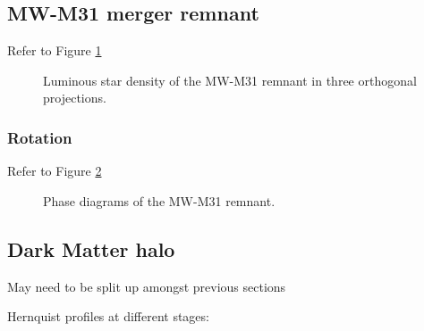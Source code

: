 \documentclass[twocolumn]{aastex63}
\newcommand{\todo}{\color{red}{TODO}\color{black}\hspace{2mm}}
\begin{document}
\subsection{MW-M31 merger remnant}

\todo{shape - how to get principal axes? boxiness?}

Refer to Figure \ref{fig:rem_shape}

\begin{figure}[htb!]
	\caption{Luminous star density of the MW-M31 remnant in three orthogonal projections.
	\label{fig:rem_shape}}
\end{figure}


\subsubsection{Rotation}

\todo{phase diagram}

Refer to Figure \ref{fig:rem_phase}

\begin{figure}[htb!]
	\caption{Phase diagrams of the MW-M31 remnant.
	\label{fig:rem_phase}}
\end{figure}

\todo{alignment between particles of different origin?}

\subsection{Dark Matter halo}

May need to be split up amongst previous sections

\todo{what happens during close approach? merger? remanant?}

Hernquist profiles at different stages: \todo{plot of scale radius evolution}


{}

\end{document}
